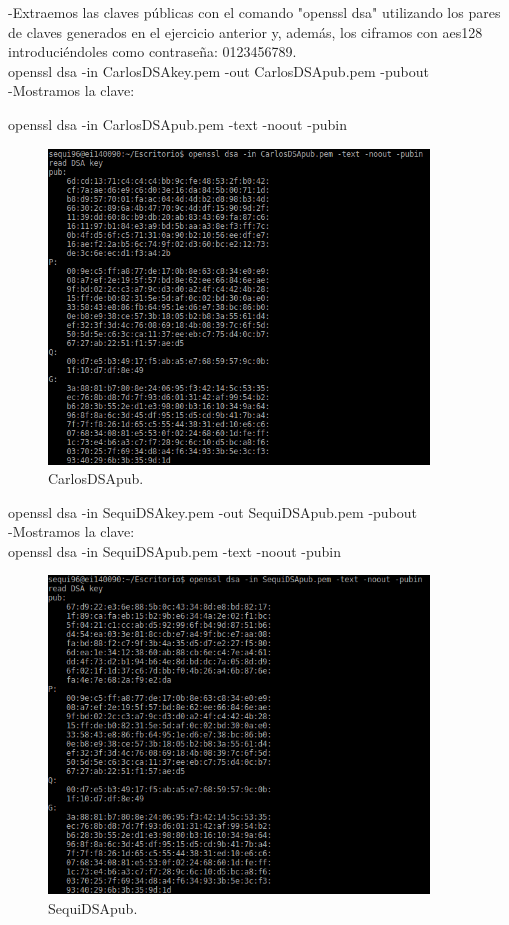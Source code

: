 -Extraemos las claves públicas con el comando "openssl dsa" utilizando los pares de claves generados en el ejercicio
anterior y, además, los ciframos con aes128 introduciéndoles como contraseña: 0123456789. \\

openssl dsa -in CarlosDSAkey.pem -out CarlosDSApub.pem -pubout\\

-Mostramos la clave:

openssl dsa -in CarlosDSApub.pem -text -noout -pubin

\begin{figure}[h]
	\centering
	\includegraphics[width=0.9\textwidth]{imagenes/CarlosDSApub}
	\caption{CarlosDSApub.}
\end{figure}

openssl dsa -in SequiDSAkey.pem -out SequiDSApub.pem -pubout \\

-Mostramos la clave:\\

openssl dsa -in SequiDSApub.pem -text -noout -pubin

\begin{figure}[h]
	\centering
	\includegraphics[width=0.9\textwidth]{imagenes/SequiDSApub}
	\caption{SequiDSApub.}
\end{figure}



